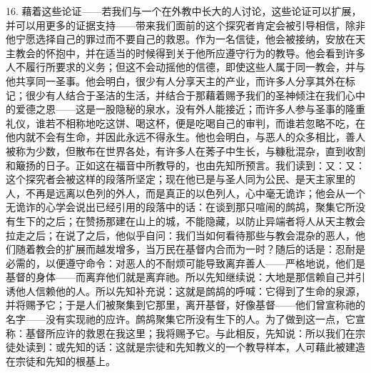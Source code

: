 16. 藉着这些论证——若我们与一个在外教中长大的人讨论，这些论证可以扩展，并可以用更多的证据支持——带来我们面前的这个探究者肯定会被引导相信，除非他宁愿选择自己的罪过而不要自己的救恩。作为一名信徒，他会被接纳，安放在天主教会的怀抱中，并在适当的时候得到关于他所应遵守行为的教导。他会看到许多人不履行所要求的义务；但这不会动摇他的信德，即使这些人属于同一教会，并与他共享同一圣事。他会明白，很少有人分享天主的产业，而许多人分享其外在标记；很少有人结合于圣洁的生活，并结合于那藉着赐予我们的圣神倾注在我们心中的爱德之恩——这是一股隐秘的泉水，没有外人能接近；而许多人参与圣事的隆重礼仪，谁若不相称地吃这饼、喝这杯，便是吃喝自己的审判，而谁若忽略不吃，在他内就不会有生命，并因此永远不得永生。他也会明白，与恶人的众多相比，善人被称为少数，但散布在世界各处，有许多人在莠子中生长，与糠秕混杂，直到收割和簸扬的日子。正如这在福音中所教导的，也由先知所预言。我们读到：又：又：这个探究者会被这样的段落所坚定；现在他已是与圣人同为公民、是天主家里的人，不再是远离以色列的外人，而是真正的以色列人，心中毫无诡诈；他会从一个无诡诈的心学会说出已经引用的段落中的话：在谈到那只喧闹的鹧鸪，聚集它所没有生下的之后；在赞扬那建在山上的城，不能隐藏，以防止异端者将人从天主教会拉走之后；在说了之后，他似乎自问：我们当如何看待那些与教会混杂的恶人，他们随着教会的扩展而越发增多，当万民在基督内合而为一时？随后的话是：忍耐是必需的，以便遵守命令：对恶人的不耐烦可能导致离弃善人——严格地说，他们是基督的身体——而离弃他们就是离弃祂。所以先知继续说：大地是那信赖自己并引诱他人信赖他的人。所以先知补充说：这就是鹧鸪的呼喊：它得到了生命的泉源，并将赐予它；于是人们被聚集到它那里，离开基督，好像基督——他们曾宣称祂的名字——没有实现祂的应许。鹧鸪聚集它所没有生下的人。为了做到这一点，它宣称：基督所应许的救恩在我这里；我将赐予它。与此相反，先知说：所以我们在宗徒处读到：或先知的话：这就是宗徒和先知教义的一个教导样本，人可藉此被建造在宗徒和先知的根基上。\par

